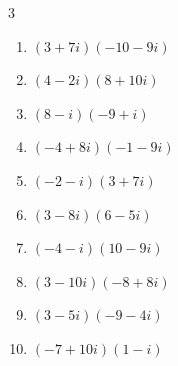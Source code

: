 \begin{multicols}{3}
\begin{enumerate}
        \phantom{$\displaystyle =-30+52i$}

  \item $\displaystyle (3+7i)(-10-9i)$

        \phantom{$\displaystyle =33-97i$}

  \item $\displaystyle (4-2i)(8+10i)$

        \phantom{$\displaystyle =52+24i$}

  \item $\displaystyle (8-i)(-9+i)$

        \phantom{$\displaystyle =-71+17i$}

  \item $\displaystyle (-4+8i)(-1-9i)$

        \phantom{$\displaystyle =76+28i$}

  \item $\displaystyle (-2-i)(3+7i)$

        \phantom{$\displaystyle =1-17i$}

  \item $\displaystyle (3-8i)(6-5i)$

        \phantom{$\displaystyle =-22-63i$}

  \item $\displaystyle (-4-i)(10-9i)$

        \phantom{$\displaystyle =-49+26i$}

  \item $\displaystyle (3-10i)(-8+8i)$

        \phantom{$\displaystyle =56+104i$}

  \item $\displaystyle (3-5i)(-9-4i)$

        \phantom{$\displaystyle =-47+33i$}

  \item $\displaystyle (-7+10i)(1-i)$

        \phantom{$\displaystyle =3+17i$}

\end{enumerate}
\end{multicols}

\newpage
\resetdrill

